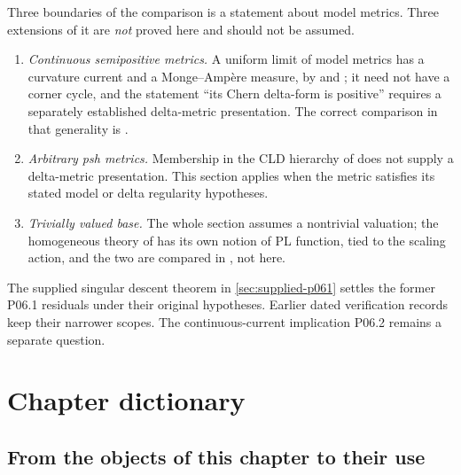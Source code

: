 \begin{warning}{Three boundaries of the comparison}
 is a statement about model metrics.  Three
extensions of it are \emph{not} proved here and should not be assumed.
\begin{enumerate}
\item \emph{Continuous semipositive metrics.}  A uniform limit of model
 metrics has a curvature current and a Monge--Amp\`ere measure, by
  and
 ; it need not have a corner cycle, and the
 statement ``its Chern delta-form is positive'' requires a separately
 established delta-metric presentation.  The
 correct comparison in that generality is
 .
\item \emph{Arbitrary psh metrics.}  Membership in the CLD hierarchy of
  does not supply a delta-metric presentation.
 This section applies when the metric satisfies its stated model or delta
 regularity hypotheses.
\item \emph{Trivially valued base.}  The whole section assumes a nontrivial
 valuation; the homogeneous theory of  has its own notion of
 PL function, tied to the scaling action, and the two are compared in
 , not here.
\end{enumerate}
\end{warning}



The supplied singular descent theorem in \cref{sec:supplied-p061}
settles the former P06.1 residuals under their original hypotheses.
Earlier dated verification records keep their narrower scopes. The
continuous-current implication P06.2 remains a separate question.

\section{Chapter dictionary}
\label{sec:ch18-dictionary}

\subsection{From the objects of this chapter to their use}
\label{sec:ch18-dict-forward}

